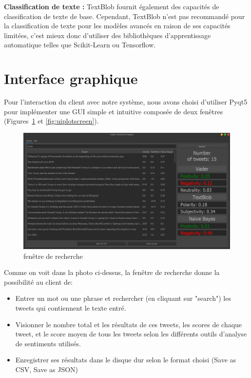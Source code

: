 \textbf{Classification de texte :}
TextBlob fournit également des capacités de classification de texte de base. Cependant, TextBlob n'est pas recommandé pour la classification de texte pour les modèles avancés en raison de ses capacités limitées, c'est mieux donc d'utiliser des bibliothèques d'apprentissage automatique telles que Scikit-Learn ou Tensorflow.

\section{Interface graphique}
Pour l'interaction du client avec notre système, nous avons choisi d'utiliser Pyqt5 pour implémenter une GUI simple et intuitive composée de deux fenêtres (Figures~\ref{fig:uisearchscreen} et \ref{fig:uiplotscreen}).
\begin{figure}
    \centering
    \includegraphics[width=\textwidth]{realisation/assets/1.png}
    \caption{fenêtre de recherche}
    \label{fig:uisearchscreen}
\end{figure}
Comme on voit dans la photo ci-dessus, la fenêtre de recherche donne la possibilité au client de:
\begin{itemize}
    \item Entrer un mot ou une phrase et rechercher (en cliquant sur "search") les tweets qui contiennent le texte entré.
    \item Visionner le nombre total et les résultats de ces tweets, les scores de chaque tweet, et le score moyen de tous les tweets selon les différents outils d'analyse de sentiments utilisés.
    \item Enregistrer ses résultats dans le disque dur selon le format choisi (Save as CSV, Save as JSON)
\end{itemize}
